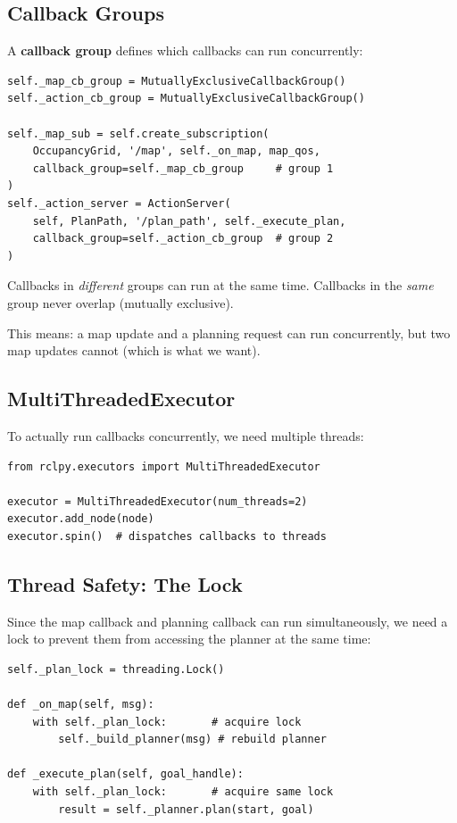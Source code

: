 \documentclass[12pt, a4paper]{article}
\begin{document}
\subsection{Callback Groups}

A \textbf{callback group} defines which callbacks can run concurrently:

\begin{lstlisting}[style=python, caption={Callback groups (planner\_node.py)}]
self._map_cb_group = MutuallyExclusiveCallbackGroup()
self._action_cb_group = MutuallyExclusiveCallbackGroup()

self._map_sub = self.create_subscription(
    OccupancyGrid, '/map', self._on_map, map_qos,
    callback_group=self._map_cb_group     # group 1
)
self._action_server = ActionServer(
    self, PlanPath, '/plan_path', self._execute_plan,
    callback_group=self._action_cb_group  # group 2
)
\end{lstlisting}

Callbacks in \emph{different} groups can run at the same time.
Callbacks in the \emph{same} group never overlap (mutually exclusive).

This means: a map update and a planning request can run concurrently,
but two map updates cannot (which is what we want).

\subsection{MultiThreadedExecutor}

To actually run callbacks concurrently, we need multiple threads:

\begin{lstlisting}[style=python, caption={Multi-threaded executor (planner\_node.py)}]
from rclpy.executors import MultiThreadedExecutor

executor = MultiThreadedExecutor(num_threads=2)
executor.add_node(node)
executor.spin()  # dispatches callbacks to threads
\end{lstlisting}

\subsection{Thread Safety: The Lock}

Since the map callback and planning callback can run simultaneously,
we need a lock to prevent them from accessing the planner at the
same time:

\begin{lstlisting}[style=python, caption={Thread safety with a lock}]
self._plan_lock = threading.Lock()

def _on_map(self, msg):
    with self._plan_lock:       # acquire lock
        self._build_planner(msg) # rebuild planner

def _execute_plan(self, goal_handle):
    with self._plan_lock:       # acquire same lock
        result = self._planner.plan(start, goal)
\end{lstlisting}
\end{document}
